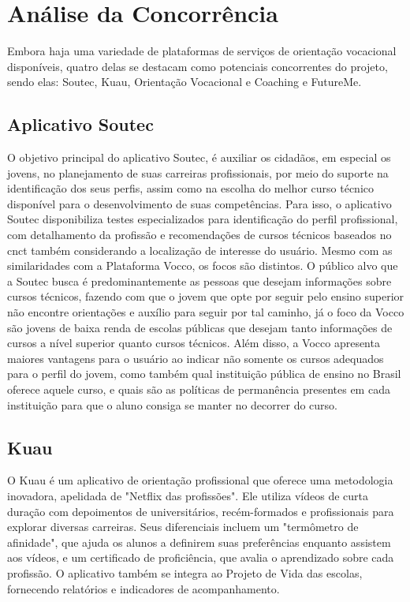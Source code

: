 \section{Análise da Concorrência}

Embora haja uma variedade de plataformas de serviços de orientação vocacional disponíveis, quatro delas se destacam como potenciais concorrentes do projeto, sendo elas: Soutec, Kuau, Orientação Vocacional e Coaching e FutureMe.

\subsection{Aplicativo Soutec}
O objetivo principal do aplicativo Soutec,  é auxiliar os cidadãos, em especial os jovens, no planejamento de suas carreiras profissionais, por meio do suporte na identificação dos seus perfis, assim como na escolha do melhor curso técnico disponível para o desenvolvimento de suas competências. Para isso, o aplicativo Soutec disponibiliza testes especializados para identificação do perfil profissional, com detalhamento da profissão e recomendações de cursos técnicos baseados no \ac{cnct} também considerando a localização de interesse do usuário.
 Mesmo com as similaridades com a Plataforma Vocco, os focos são distintos. O público alvo que a Soutec busca é predominantemente as pessoas que desejam informações sobre cursos técnicos, fazendo com que o jovem que opte por seguir pelo ensino superior não encontre orientações e auxílio para seguir por tal caminho, já o foco da Vocco são jovens de baixa renda de escolas públicas que desejam tanto informações de cursos a nível superior quanto cursos técnicos. Além disso, a Vocco apresenta maiores vantagens para o usuário ao indicar não somente os cursos adequados para o perfil do jovem, como também qual instituição pública de ensino no Brasil oferece aquele curso, e quais são as políticas de permanência presentes em cada instituição para que o aluno consiga se manter no decorrer do curso.



\subsection{Kuau}
O Kuau é um aplicativo de orientação profissional que oferece uma metodologia inovadora, apelidada de "Netflix das profissões". Ele utiliza vídeos de curta duração com depoimentos de universitários, recém-formados e profissionais para explorar diversas carreiras. Seus diferenciais incluem um "termômetro de afinidade", que ajuda os alunos a definirem suas preferências enquanto assistem aos vídeos, e um certificado de proficiência, que avalia o aprendizado sobre cada profissão. O aplicativo também se integra ao Projeto de Vida das escolas, fornecendo relatórios e indicadores de acompanhamento.


